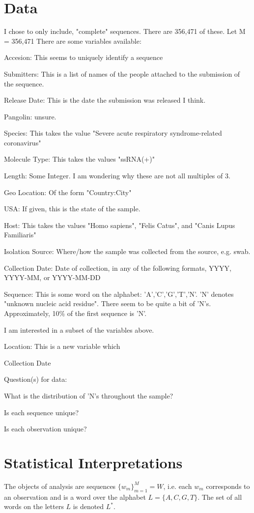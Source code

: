 \documentclass[aoas]{imsart}
\begin{document}
\section{Data}
I chose to only include, "complete" sequences. There are 356,471 of these. Let M = 356,471
There are some variables available:
\item Accesion: This seems to uniquely identify a sequence
\item Submitters: This is a list of names of the people attached to the submission of the sequence.
\item Release Date: This is the date the submission was released I think.
\item Pangolin: unsure.
\item Species: This takes the value "Severe acute respiratory syndrome-related coronavirus"
\item Molecule Type: This takes the values "ssRNA(+)"
\item Length: Some Integer. I am wondering why these are not all multiples of 3.
\item Geo Location: Of the form "Country:City"
\item USA: If given, this is the state of the sample.
\item Host: This takes the values "Homo sapiens", "Felis Catus", and "Canis Lupus Familiaris"
\item Isolation Source: Where/how the sample was collected from the source, e.g. swab.
\item Collection Date: Date of collection, in any of the following formats, YYYY, YYYY-MM, or YYYY-MM-DD
\item Sequence: This is some word on the alphabet: 'A','C','G','T','N'. 'N' denotes "unknown nucleic acid residue". There seem to be quite a bit of 'N's. Approximately, 10\% of the first sequence is 'N'.

I am interested in a subset of the variables above.
\item Location: This is a new variable which 
\item Collection Date

Question(s) for data:
\item What is the distribution of 'N's throughout the sample?
\item Is each sequence unique?
\item Is each observation unique?

\section{Statistical Interpretations}
The objects of analysis are sequences $\{w_m\}_{m=1}^M = W$, i.e. each $w_m$ corresponds to an observation and is a word over the alphabet $L=\{A,C,G,T\}$. The set of all words on the letters $L$ is denoted $L^*$.
\end{document}
